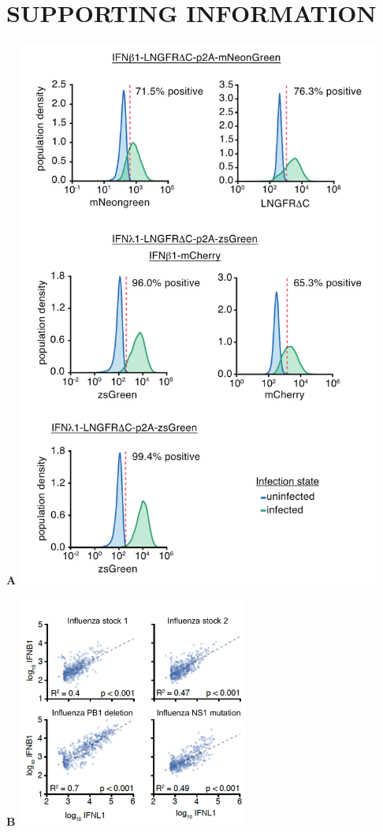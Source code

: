 \documentclass[10pt,letterpaper]{article}
\begin{document}
\clearpage
\nolinenumbers
\normalsize

\section*{SUPPORTING INFORMATION}

\begin{suppfig}
\begin{minipage}[t]{0.46\textwidth}
{\bf \Large A}
\includegraphics[width=0.9\textwidth, valign=t]{figures/IFN_stochastic/IFN_reporter/Sendai_validation.pdf}
\end{minipage}
\begin{minipage}[t]{0.55\textwidth}
{\bf \Large B}
\includegraphics[width=0.57\textwidth, valign=t]{figures/IFN_stochastic/IFN_reporter/IFNbeta_IFN_lambda_correlated.pdf}
\vspace{0.1in}


\end{minipage}
\end{suppfig}
\end{document}
